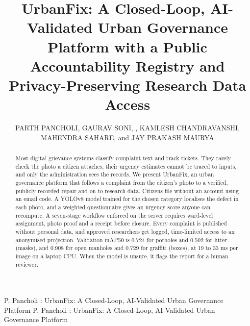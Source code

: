 \documentclass{ieeeaccess}
\begin{document}

\title{UrbanFix: A Closed-Loop, AI-Validated Urban Governance Platform with a Public Accountability Registry and Privacy-Preserving Research Data Access}

\author{\uppercase{Parth Pancholi},
\uppercase{Gaurav Soni}, ,
\uppercase{Kamlesh Chandravanshi},
\uppercase{Mahendra Sahare}, and
\uppercase{Jay Prakash Maurya}}

\address[1]{School of Computing Science and Engineering, VIT Bhopal University, Bhopal, India (e-mail: parth.25bce10443@vitbhopal.ac.in; gaurav.soni@vitbhopal.ac.in; kamlesh.chandravanshi@vitbhopal.ac.in; jpeemaurya@gmail.com)}
\address[2]{School of Computer Science and Engineering, VIT-AP University, Amaravati, India (e-mail: mahendra.sahare@vitap.ac.in)}

\markboth
{P. Pancholi \headeretal: UrbanFix: A Closed-Loop, AI-Validated Urban Governance Platform}
{P. Pancholi \headeretal: UrbanFix: A Closed-Loop, AI-Validated Urban Governance Platform}


\begin{abstract}
Most digital grievance systems classify complaint text and track tickets. They rarely check the photo a citizen attaches, their urgency estimates cannot be traced to inputs, and only the administration sees the records. We present UrbanFix, an urban governance platform that follows a complaint from the citizen's photo to a verified, publicly recorded repair and on to research data. Citizens file without an account using an email code. A YOLOv8 model trained for the chosen category localises the defect in each photo, and a weighted questionnaire gives an urgency score anyone can recompute. A seven-stage workflow enforced on the server requires ward-level assignment, photo proof and a receipt before closure. Every complaint is published without personal data, and approved researchers get logged, time-limited access to an anonymised projection. Validation mAP50 is 0.724 for potholes and 0.502 for litter (masks), and 0.908 for open manholes and 0.729 for graffiti (boxes), at 19 to 33 ms per image on a laptop CPU. When the model is unsure, it flags the report for a human reviewer.
\end{abstract}
\end{document}
